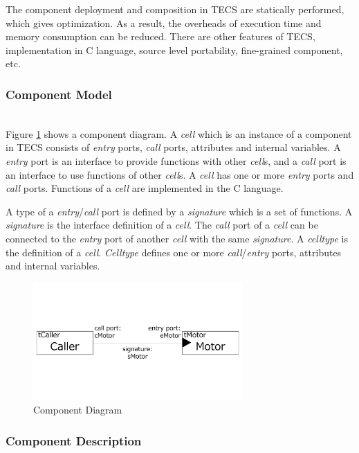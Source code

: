 \documentclass[conference,compsoc]{IEEEtran}
\begin{document}
The component deployment and composition in TECS are statically performed, which gives optimization.
As a result, the overheads of execution time and memory consumption can be reduced.
There are other features of TECS, implementation in C language, source level portability, fine-grained component, etc.

\subsubsection{Component Model}\mbox{}\\

Figure \ref{fig:component} shows a component diagram.
A {\it cell} which is an instance of a component in TECS consists of {\it entry} ports, {\it call} ports, attributes and internal variables.
A {\it entry} port is an interface to provide functions with other {\it cell}s, and a {\it call} port is an interface to use functions of other {\it cell}s.
A {\it cell} has one or more {\it entry} ports and {\it call} ports.
Functions of a {\it cell} are implemented in the C language.

A type of a {\it entry}/{\it call} port is defined by a {\it signature} which is a set of functions.
A {\it signature} is the interface definition of a {\it cell}.
The {\it call} port of a {\it cell} can be connected to the {\it entry} port of another {\it cell} with the same {\it signature}.
A {\it celltype} is the definition of a {\it cell}.
{\it Celltype} defines one or more {\it call}/{\it entry} ports, attributes and internal variables.

\begin{figure}[t]
    \centering
    \includegraphics[width=8cm,clip]{figure/component_diagram.pdf}
    \caption{Component Diagram}
    \label{fig:component}
\end{figure}

\subsubsection{Component Description}\mbox{}\\
\end{document}
